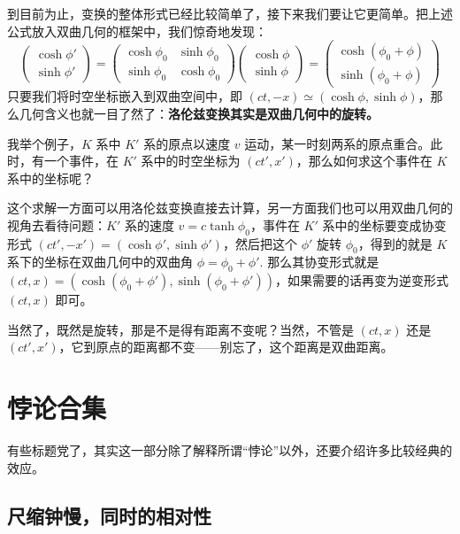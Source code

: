 \documentclass[12pt, a4paper, oneside]{ctexbook}
\begin{document}
到目前为止，变换的整体形式已经比较简单了，接下来我们要让它更简单。把上述公式放入双曲几何的框架中，我们惊奇地发现：
\begin{equation}
	\begin{pmatrix}
		\cosh\phi' \\ \sinh\phi'
	\end{pmatrix}=
	\begin{pmatrix}
		\cosh\phi_{0} & \sinh\phi_{0} \\
		\sinh\phi_{0} & \cosh\phi_{0}
	\end{pmatrix}\begin{pmatrix}
		\cosh\phi \\ \sinh\phi
	\end{pmatrix}=
	\begin{pmatrix}
		\cosh(\phi_{0}+\phi) \\ \sinh(\phi_{0}+\phi)
	\end{pmatrix}
\end{equation}
只要我们将时空坐标嵌入到双曲空间中，即 $(ct,-x)\simeq(\cosh\phi,\sinh\phi)$，那么几何含义也就一目了然了：\textbf{洛伦兹变换其实是双曲几何中的旋转。}  

\par 我举个例子，$K$ 系中 $K'$ 系的原点以速度 $v$ 运动，某一时刻两系的原点重合。此时，有一个事件，在 $K'$ 系中的时空坐标为 $(ct',x')$，那么如何求这个事件在 $K$ 系中的坐标呢？

\par 这个求解一方面可以用洛伦兹变换直接去计算，另一方面我们也可以用双曲几何的视角去看待问题：$K'$ 系的速度 $v=c\tanh\phi_{0}$，事件在 $K'$ 系中的坐标要变成协变形式 $(ct',-x')=(\cosh\phi',\sinh\phi')$，然后把这个 $\phi'$ 旋转 $\phi_{0}$，得到的就是 $K$ 系下的坐标在双曲几何中的双曲角 $\phi=\phi_{0}+\phi'$. 那么其协变形式就是 $(ct,x)=(\cosh(\phi_{0}+\phi'),\sinh(\phi_{0}+\phi'))$，如果需要的话再变为逆变形式 $(ct,x)$ 即可。

\par 当然了，既然是旋转，那是不是得有距离不变呢？当然，不管是 $(ct,x)$ 还是 $(ct',x')$，它到原点的距离都不变——别忘了，这个距离是双曲距离。


\section{悖论合集}

有些标题党了，其实这一部分除了解释所谓“悖论”以外，还要介绍许多比较经典的效应。

\subsection{尺缩钟慢，同时的相对性}
\end{document}
